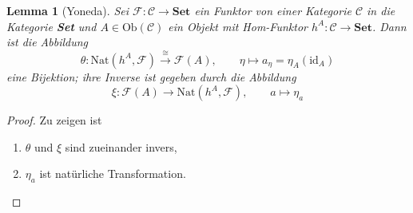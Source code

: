 \documentclass[a4paper, 11pt]{scrartcl}
\newcommand{\Hom}{\text{Hom}}
\newcommand{\id}{\text{id}}
\newcommand{\Ob}{\text{Ob}}
\theoremstyle{basicstyle}
\newtheorem{lemma}[definition]{Lemma}
\begin{document}
    \begin{lemma}[Yoneda]\label{lem:yoneda}
        Sei \(\mathcal{F}: \mathcal{C} \to \textbf{Set}\) ein Funktor von einer Kategorie \(\mathcal{C}\) in die Kategorie \textbf{Set} und \(A \in \Ob(\mathcal{C})\) ein Objekt mit Hom-Funktor \(h^A : \mathcal{C} \to \textbf{Set}\).
        Dann ist die Abbildung
        \[\theta : \text{Nat}(h^A, \mathcal{F}) \overset{\cong}{\longrightarrow} \mathcal{F}(A), \qquad \eta \mapsto a_{\eta} = \eta_A(\id_A)\]
        eine Bijektion; ihre Inverse ist gegeben durch die Abbildung
        \[\xi : \mathcal{F}(A) \longrightarrow \text{Nat}(h^A, \mathcal{F}), \qquad a \mapsto \eta_a\]
    \end{lemma}
    \begin{proof}
        Zu zeigen ist
        \begin{enumerate}
            \item \(\theta\) und \(\xi\) sind zueinander invers,
            \item \(\eta_a\) ist natürliche Transformation. \qedhere
        \end{enumerate}
    \end{proof}
\end{document}
